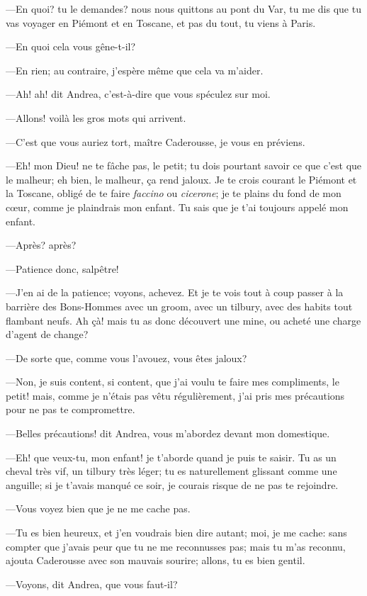 —En quoi? tu le demandes? nous nous quittons au pont du Var, tu me dis que tu vas voyager en Piémont et en Toscane, et pas du tout, tu viens à Paris. 

—En quoi cela vous gêne-t-il? 

—En rien; au contraire, j'espère même que cela va m'aider. 

—Ah! ah! dit Andrea, c'est-à-dire que vous spéculez sur moi. 

—Allons! voilà les gros mots qui arrivent. 

—C'est que vous auriez tort, maître Caderousse, je vous en préviens. 

—Eh! mon Dieu! ne te fâche pas, le petit; tu dois pourtant savoir ce que c'est que le malheur; eh bien, le malheur, ça rend jaloux. Je te crois courant le Piémont et la Toscane, obligé de te faire \textit{faccino} ou \textit{cicerone}; je te plains du fond de mon cœur, comme je plaindrais mon enfant. Tu sais que je t'ai toujours appelé mon enfant. 

—Après? après? 

—Patience donc, salpêtre! 

—J'en ai de la patience; voyons, achevez. Et je te vois tout à coup passer à la barrière des Bons-Hommes avec un groom, avec un tilbury, avec des habits tout flambant neufs. Ah çà! mais tu as donc découvert une mine, ou acheté une charge d'agent de change? 

—De sorte que, comme vous l'avouez, vous êtes jaloux? 

—Non, je suis content, si content, que j'ai voulu te faire mes compliments, le petit! mais, comme je n'étais pas vêtu régulièrement, j'ai pris mes précautions pour ne pas te compromettre. 

—Belles précautions! dit Andrea, vous m'abordez devant mon domestique. 

—Eh! que veux-tu, mon enfant! je t'aborde quand je puis te saisir. Tu as un cheval très vif, un tilbury très léger; tu es naturellement glissant comme une anguille; si je t'avais manqué ce soir, je courais risque de ne pas te rejoindre. 

—Vous voyez bien que je ne me cache pas. 

—Tu es bien heureux, et j'en voudrais bien dire autant; moi, je me cache: sans compter que j'avais peur que tu ne me reconnusses pas; mais tu m'as reconnu, ajouta Caderousse avec son mauvais sourire; allons, tu es bien gentil. 

—Voyons, dit Andrea, que vous faut-il? 

